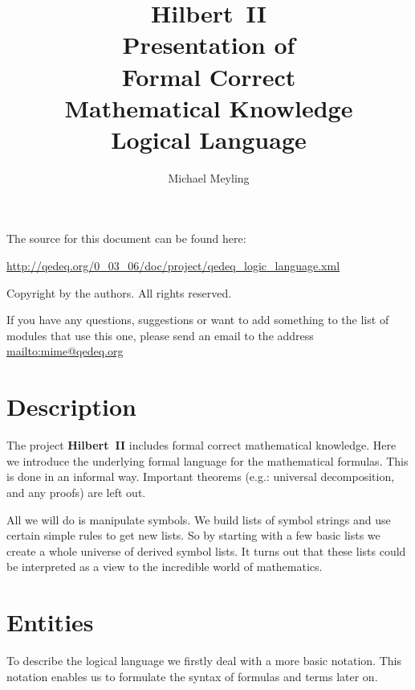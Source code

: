 \documentclass[a4paper,german,10pt,twoside]{book}
\title{\textbf{Hilbert~II} \\
\vspace*{1cm} 
Presentation of \\ 
Formal Correct \\
Mathematical Knowledge \\
\vspace*{1cm} Logical Language}
\author{
Michael Meyling
}
\theoremstyle{definition}
\theoremstyle{remark}
\begin{document}
\maketitle

\setlength{\parskip}{5pt plus 2pt minus 1pt}
\mbox{}
\vfill

\par
The source for this document can be found here:
\par
\url{http://qedeq.org/0_03_06/doc/project/qedeq_logic_language.xml}

\par
Copyright by the authors. All rights reserved.
\par
If you have any questions, suggestions or want to add something to the list of modules that use this one, please send an email to the address \url{mailto:mime@qedeq.org}

\setlength{\parskip}{0pt}
\tableofcontents

\setlength{\parskip}{5pt plus 2pt minus 1pt}

\chapter*{Description} \label{chapter0} \hypertarget{chapter0}{}

The project \textbf{Hilbert~II} includes formal correct mathematical knowledge. Here we introduce the underlying formal language for the mathematical formulas. This is done in an informal way. Important theorems (e.g.: universal decomposition, and any proofs) are left out.

\par
All we will do is manipulate symbols. We build lists of symbol strings and use certain simple rules to get new lists. So by starting with a few basic lists we create a whole universe of derived symbol lists. 
It turns out that these lists could be interpreted as a view to the incredible world of mathematics.


\chapter{Entities} \label{chapter1} \hypertarget{chapter1}{}

To describe the logical language we firstly deal with a more basic notation. This notation enables us to formulate the syntax of formulas and terms later on.
\end{document}
